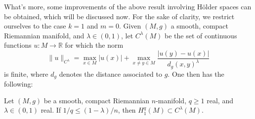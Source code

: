 \documentclass[12pt,hyperref,a4paper,UTF8]{ctexart}
\begin{document}
\vskip 3pt
What's more, some improvements of the above result involving Hölder spaces can be obtained, which will be discussed now. For the sake of clarity, we restrict ourselves to the case $k=1$ and $m=0$. Given $(M, g)$ a smooth, compact Riemannian manifold, and $\lambda \in(0,1)$, let $C^\lambda(M)$ be the set of continuous functions $u: M \rightarrow \mathbb{R}$ for which the norm
$$
\|u\|_{C^\lambda}=\max _{x \in M}|u(x)|+\max _{x \neq y \in M} \frac{|u(y)-u(x)|}{d_g(x, y)^\lambda}
$$
is finite, where $d_g$ denotes the distance associated to $g$. One then has the following:

\begin{Theorem}
    Let $(M, g)$ be a smooth, compact Riemannian $n$-manifold, $q \geq 1$ real, and $\lambda \in(0,1)$ real. If $1 / q \leq(1-\lambda) / n$, then $H_1^q(M) \subset C^\lambda(M)$.
\label{thm37}
\end{Theorem}
\end{document}
